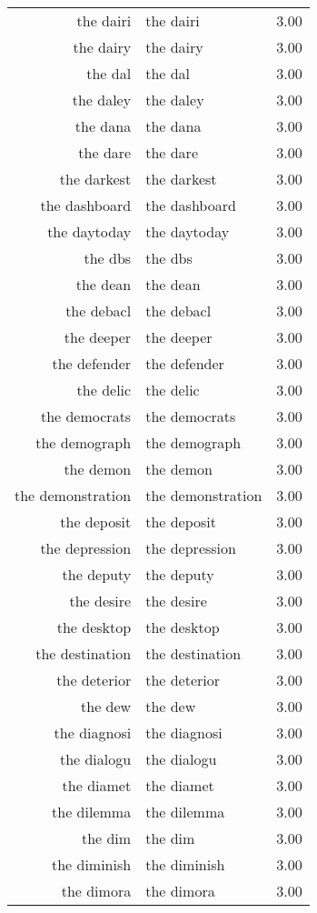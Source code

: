\begin{table}[ht]
\begin{tabular}{rlr}
  the dairi & the dairi & 3.00 \\ 
  the dairy & the dairy & 3.00 \\ 
  the dal & the dal & 3.00 \\ 
  the daley & the daley & 3.00 \\ 
  the dana & the dana & 3.00 \\ 
  the dare & the dare & 3.00 \\ 
  the darkest & the darkest & 3.00 \\ 
  the dashboard & the dashboard & 3.00 \\ 
  the daytoday & the daytoday & 3.00 \\ 
  the dbs & the dbs & 3.00 \\ 
  the dean & the dean & 3.00 \\ 
  the debacl & the debacl & 3.00 \\ 
  the deeper & the deeper & 3.00 \\ 
  the defender & the defender & 3.00 \\ 
  the delic & the delic & 3.00 \\ 
  the democrats & the democrats & 3.00 \\ 
  the demograph & the demograph & 3.00 \\ 
  the demon & the demon & 3.00 \\ 
  the demonstration & the demonstration & 3.00 \\ 
  the deposit & the deposit & 3.00 \\ 
  the depression & the depression & 3.00 \\ 
  the deputy & the deputy & 3.00 \\ 
  the desire & the desire & 3.00 \\ 
  the desktop & the desktop & 3.00 \\ 
  the destination & the destination & 3.00 \\ 
  the deterior & the deterior & 3.00 \\ 
  the dew & the dew & 3.00 \\ 
  the diagnosi & the diagnosi & 3.00 \\ 
  the dialogu & the dialogu & 3.00 \\ 
  the diamet & the diamet & 3.00 \\ 
  the dilemma & the dilemma & 3.00 \\ 
  the dim & the dim & 3.00 \\ 
  the diminish & the diminish & 3.00 \\ 
  the dimora & the dimora & 3.00 \\ 

\end{tabular}
\end{table}
